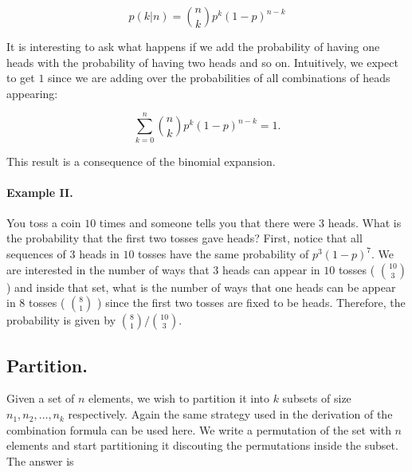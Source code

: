 \documentclass[12pt]{article}
\begin{document}
\begin{equation}
p( k | n ) = {n \choose k} p^{k} ( 1 - p )^{n - k}
\end{equation}

It is interesting to ask what happens if we add the probability of having one heads with the probability of having two heads and so on.
Intuitively, we expect to get $1$ since we are adding over the probabilities of all combinations of heads appearing:

\begin{equation}
\sum_{k = 0}^{n}  {n \choose k} p^{k} ( 1 - p )^{n - k} = 1.
\end{equation}

\noindent
This result is a consequence of the binomial expansion.

\paragraph{Example II.}
You toss a coin $10$ times and someone tells you that there were $3$ heads.
What is the probability that the first two tosses gave heads?
%
First, notice that all sequences of $3$ heads in $10$ tosses have the same probability of $p^{3} ( 1 - p)^{7}$.
We are interested in the number of ways that $3$ heads can appear in $10$ tosses ( ${10 \choose 3}$) and inside 
that set, what is the number of ways that one heads can be appear in $8$ tosses ( ${8 \choose 1}$ ) since 
the first two tosses are fixed to be heads.
Therefore, the probability is given by ${8 \choose 1}  / {10 \choose 3 }$.

\subsection{Partition.}
Given a set of $n$ elements, we wish to partition it into $k$ subsets of size $n_{1},  n_{2}, \ldots, n_{k}$
respectively. Again the same strategy used in the derivation of the combination formula can be used here.
We write a permutation of the set with $n$ elements and start partitioning it discouting the permutations 
inside the subset.
The answer is 
\end{document}
